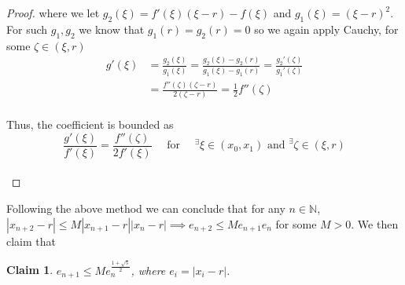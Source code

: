 \documentclass[paper=a4, fontsize=11pt]{scrartcl}
\newtheorem{claim}{Claim}
\begin{document}
\begin{proof}
	where we let $g_2(\xi)= f'(\xi)(\xi - r) - f(\xi)$ and $g_1(\xi)=(\xi - r )^2$. For such $g_1,g_2$ we know that $g_1(r)=g_2(r)=0$ so we again apply Cauchy, for some $\zeta \in (\xi,r)$ \\
	
	\begin{equation}\nonumber
		\begin{split}
		g'(\xi) &= \frac{g_2(\xi)}{g_1(\xi)} = \frac{g_2(\xi) - g_2(r)}{g_1(\xi)- g_1(r)} = \frac{g_2'(\zeta)}{g_1'(\zeta)} \\[2.5ex]
		&= \frac{f''(\zeta)(\zeta - r)}{2(\zeta - r)} = \frac{1}{2} f''(\zeta)
		\end{split}
	\end{equation}\\
	
	Thus, the coefficient is bounded as \\
	
	\begin{equation}\nonumber
		\frac{g'(\xi)}{f'(\xi)} = \frac{f''(\zeta)}{2 f'(\xi)} \quad \text{ for } \quad ^\exists \xi \in (x_0,x_1)\text{ and } ^\exists\zeta \in (\xi,r) 
	\end{equation}\\
\end{proof}

Following the above method we can conclude that for any $n \in \mathbb{N}$, $|x_{n+2} - r| \leq M |x_{n+1} - r | |x_n - r| \implies e_{n+2} \leq M e_{n+1} e_{n}$ for some $M>0$. We then claim that\\

\begin{claim}
	$e_{n+1} \leq M e_n^{\frac{1+\sqrt{5}}{2}}$, where $e_i = |x_i -r|$.
\end{claim}
\end{document}
